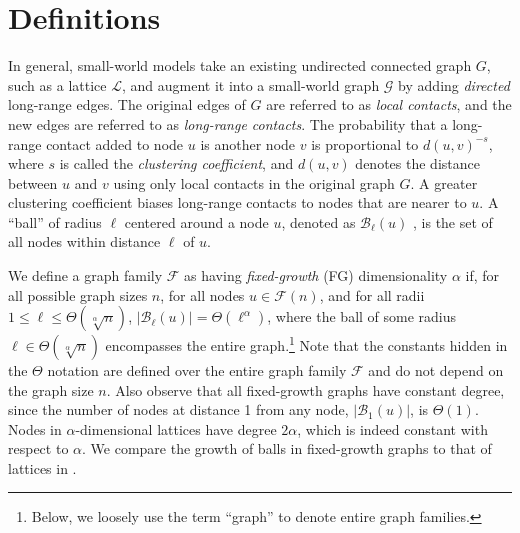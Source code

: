 \section{Definitions}

In general, small-world models take an existing undirected connected graph $G$,
such as a lattice $\mathcal{L}$, and augment it into a small-world graph
$\mathcal G$ by adding \textit{directed} long-range edges.
The original edges of $G$ are referred to as \textit{local contacts}, and the
new edges are referred to as \textit{long-range contacts}.
The probability
that a long-range contact added to node $u$ is another node $v$
is proportional to $d(u,v)^{-s}$, where $s$ is called the \textit{clustering
coefficient}, and $d(u,v)$ denotes the distance between $u$ and $v$ using only local
contacts in the original graph $G$.
A greater clustering coefficient biases long-range contacts to nodes that are
nearer to $u$.
A ``ball'' of radius $\ell$ centered around a node $u$, denoted as
$\mathcal B_\ell(u)$%
, is
the set of all nodes within distance $\ell$ of $u$.



We define a graph family $\mathcal{F}$ as having \emph{fixed-growth} (FG)
dimensionality $\alpha$ if, for all possible graph sizes $n$,
for all nodes $u \in \mathcal{F}(n)$, and for all radii
$1 \leq \ell \leq \Theta(\sqrt[\alpha]{n})$, $|\mathcal B_\ell(u)| =
\Theta(\ell^\alpha)$, where the ball of some radius $\ell \in
\Theta(\sqrt[\alpha]{n})$ encompasses the entire graph.\footnote{
Below, we loosely use the term ``graph'' to denote entire graph families.}
Note that the constants hidden in the $\Theta$ notation are defined over the
entire graph family $\mathcal{F}$ and do not depend on the graph size $n$.
Also observe that all fixed-growth graphs
have constant degree, since the number of nodes at distance 1 from any node,
$|\mathcal B_1(u)|$, is $\Theta(1)$.
Nodes in $\alpha$-dimensional lattices have degree $2 \alpha$, which is indeed
constant with respect to $\alpha$.
We compare the growth of balls in fixed-growth graphs to that of lattices in
.


